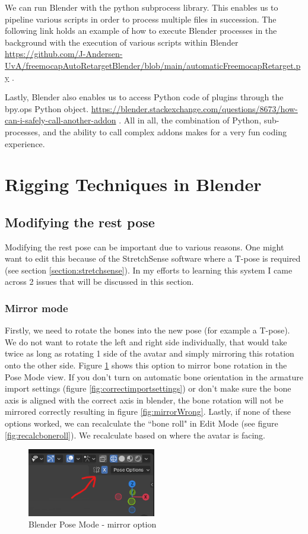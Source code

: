 \documentclass{uva-inf-article}
\begin{document}
We can run Blender with the python subprocess library. This enables us to pipeline various scripts in order to process multiple files in succession. The following link holds an example of how to execute Blender processes in the background with the execution of various scripts within Blender \url{https://github.com/J-Andersen-UvA/freemocapAutoRetargetBlender/blob/main/automaticFreemocapRetarget.py} .

Lastly, Blender also enables us to access Python code of plugins through the bpy.ops Python object. \url{https://blender.stackexchange.com/questions/8673/how-can-i-safely-call-another-addon} . All in all, the combination of Python, sub-processes, and the ability to call complex addons makes for a very fun coding experience.

\section{Rigging Techniques in Blender}
\subsection{Modifying the rest pose}
Modifying the rest pose can be important due to various reasons. One might want to edit this because of the StretchSense software where a T-pose is required (see section \ref{section:stretchsense}). In my efforts to learning this system I came across 2 issues that will be discussed in this section.

\subsubsection{Mirror mode}
Firstly, we need to rotate the bones into the new pose (for example a T-pose). We do not want to rotate the left and right side individually, that would take twice as long as rotating 1 side of the avatar and simply mirroring this rotation onto the other side. Figure \ref{fig:mirrorOption} shows this option to mirror bone rotation in the Pose Mode view.
If you don't turn on automatic bone orientation in the armature import settings (figure \ref{fig:correctimportsettings}) or don't make sure the bone axis is aligned with the correct axis in blender, the bone rotation will not be mirrored correctly resulting in figure \ref{fig:mirrorWrong}. Lastly, if none of these options worked, we can recalculate the ``bone roll" in Edit Mode (see figure \ref{fig:recalcboneroll}). We recalculate based on where the avatar is facing.
\begin{figure}[hbt!]
    \centering
    \includegraphics[width=0.5\textwidth]{imgs/mirrormode.png}
    \caption{Blender Pose Mode - mirror option}
    \label{fig:mirrorOption}
\end{figure}
\end{document}
